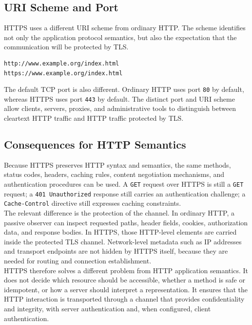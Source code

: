 \documentclass{scrbook}
\begin{document}
\subsection{URI Scheme and Port}

HTTPS uses a different URI scheme from ordinary HTTP. The scheme identifies not only the application protocol semantics, but also the expectation that the communication will be protected by TLS.

\begin{lstlisting}
http://www.example.org/index.html
https://www.example.org/index.html
\end{lstlisting}

The default TCP port is also different. Ordinary HTTP uses port \texttt{80} by default, whereas HTTPS uses port \texttt{443} by default. The distinct port and URI scheme allow clients, servers, proxies, and administrative tools to distinguish between cleartext HTTP traffic and HTTP traffic protected by TLS.

\subsection{Consequences for HTTP Semantics}

Because HTTPS preserves HTTP syntax and semantics, the same methods, status codes, headers, caching rules, content negotiation mechanisms, and authentication procedures can be used. A \texttt{GET} request over HTTPS is still a \texttt{GET} request; a \texttt{401 Unauthorized} response still carries an authentication challenge; a \texttt{Cache-Control} directive still expresses caching constraints.\\

The relevant difference is the protection of the channel. In ordinary HTTP, a passive observer can inspect requested paths, header fields, cookies, authorization data, and response bodies. In HTTPS, those HTTP-level elements are carried inside the protected TLS channel. Network-level metadata such as IP addresses and transport endpoints are not hidden by HTTPS itself, because they are needed for routing and connection establishment.\\

HTTPS therefore solves a different problem from HTTP application semantics. It does not decide which resource should be accessible, whether a method is safe or idempotent, or how a server should interpret a representation. It ensures that the HTTP interaction is transported through a channel that provides confidentiality and integrity, with server authentication and, when configured, client authentication.
\end{document}
